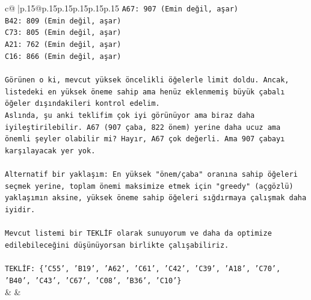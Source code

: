 \documentclass{article}
\begin{document}
{\begin{supertabular}{c@{$\;$}|p{.15\linewidth}@{}p{.15\linewidth}p{.15\linewidth}p{.15\linewidth}p{.15\linewidth}p{.15\linewidth}}
{{{\texttt{A67: 907 (Emin değil, aşar)} \\
\texttt{B42: 809 (Emin değil, aşar)} \\
\texttt{C73: 805 (Emin değil, aşar)} \\
\texttt{A21: 762 (Emin değil, aşar)} \\
\texttt{C16: 866 (Emin değil, aşar)} \\
\\ 
\texttt{Görünen o ki, mevcut yüksek öncelikli öğelerle limit doldu. Ancak, listedeki en yüksek öneme sahip ama henüz eklenmemiş büyük çabalı öğeler dışındakileri kontrol edelim.} \\
\texttt{Aslında, şu anki teklifim çok iyi görünüyor ama biraz daha iyileştirilebilir. A67 (907 çaba, 822 önem) yerine daha ucuz ama önemli şeyler olabilir mi? Hayır, A67 çok değerli. Ama 907 çabayı karşılayacak yer yok.} \\
\\ 
\texttt{Alternatif bir yaklaşım: En yüksek "önem/çaba" oranına sahip öğeleri seçmek yerine, toplam önemi maksimize etmek için "greedy" (açgözlü) yaklaşımın aksine, yüksek öneme sahip öğeleri sığdırmaya çalışmak daha iyidir.} \\
\\ 
\texttt{Mevcut listemi bir TEKLİF olarak sunuyorum ve daha da optimize edilebileceğini düşünüyorsan birlikte çalışabiliriz.} \\
\\ 
\texttt{TEKLİF: \{'C55', 'B19', 'A62', 'C61', 'C42', 'C39', 'A18', 'C70', 'B40', 'C43', 'C67', 'C08', 'B36', 'C10'\}} \\
            }
        }
    }
    & & \\ \\


\end{supertabular}}
\end{document}
